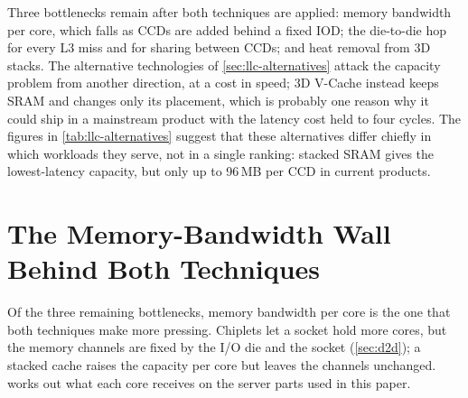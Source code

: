 Three bottlenecks remain after both techniques are applied: memory bandwidth per core, which falls as CCDs are added behind a fixed IOD; the die-to-die hop for every L3 miss and for sharing between CCDs; and heat removal from 3D stacks. The alternative technologies of \cref{sec:llc-alternatives} attack the capacity problem from another direction, at a cost in speed; 3D V-Cache instead keeps SRAM and changes only its placement, which is probably one reason why it could ship in a mainstream product with the latency cost held to four cycles. The figures in \cref{tab:llc-alternatives} suggest that these alternatives differ chiefly in which workloads they serve, not in a single ranking: stacked SRAM gives the lowest-latency capacity, but only up to 96\,MB per CCD in current products.

\section{The Memory-Bandwidth Wall Behind Both Techniques}
\label{sec:bandwidth-wall}
Of the three remaining bottlenecks, memory bandwidth per core is the one that both techniques make more pressing. Chiplets let a socket hold more cores, but the memory channels are fixed by the I/O die and the socket (\cref{sec:d2d}); a stacked cache raises the capacity per core but leaves the channels unchanged.  works out what each core receives on the server parts used in this paper.

